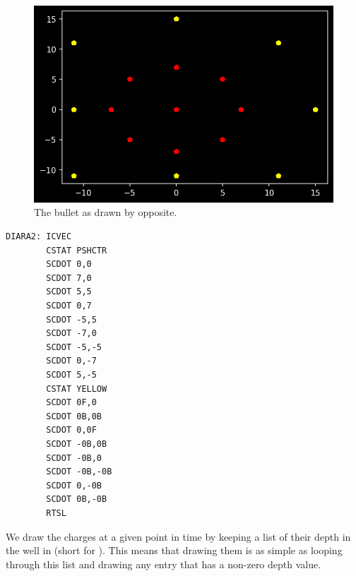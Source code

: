 \begin{minipage}[c]{0.58\linewidth}
\begin{figure}[H]
    \centering
    \begin{adjustbox}{width=8cm,center}
      \includegraphics[width=12cm]{src/bullets/red_bullet.png}%
    \end{adjustbox}
    \caption*{The bullet as drawn by  opposite.}
\end{figure}
\end{minipage}
\hspace{0.5cm}
\begin{minipage}[c]{0.35\linewidth}
  \begin{lstlisting}[basicstyle=\scriptsize\ttfamily]
DIARA2: ICVEC
        CSTAT PSHCTR
        SCDOT 0,0
        SCDOT 7,0
        SCDOT 5,5
        SCDOT 0,7
        SCDOT -5,5
        SCDOT -7,0
        SCDOT -5,-5
        SCDOT 0,-7
        SCDOT 5,-5
        CSTAT YELLOW
        SCDOT 0F,0
        SCDOT 0B,0B
        SCDOT 0,0F
        SCDOT -0B,0B
        SCDOT -0B,0
        SCDOT -0B,-0B
        SCDOT 0,-0B
        SCDOT 0B,-0B
        RTSL
\end{lstlisting}
\vspace*{\fill}
\end{minipage}

We draw the charges at a given point in time by keeping a list of their depth in
the well in  (short for ). This means
that drawing them is as simple as looping through this list and drawing any
entry that has a non-zero depth value.


